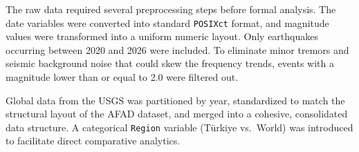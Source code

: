 \documentclass[
  11pt,
  a4paper,
  DIV=11,
  numbers=noendperiod]{scrartcl}
\newenvironment{Shaded}{\begin{snugshade}}{\end{snugshade}}
\newcommand{\AttributeTok}[1]{\textcolor[rgb]{0.40,0.45,0.13}{#1}}
\newcommand{\CommentTok}[1]{\textcolor[rgb]{0.37,0.37,0.37}{#1}}
\newcommand{\DecValTok}[1]{\textcolor[rgb]{0.68,0.00,0.00}{#1}}
\newcommand{\FunctionTok}[1]{\textcolor[rgb]{0.28,0.35,0.67}{#1}}
\newcommand{\NormalTok}[1]{\textcolor[rgb]{0.00,0.23,0.31}{#1}}
\newcommand{\OtherTok}[1]{\textcolor[rgb]{0.00,0.23,0.31}{#1}}
\newcommand{\SpecialCharTok}[1]{\textcolor[rgb]{0.37,0.37,0.37}{#1}}
\newcommand{\StringTok}[1]{\textcolor[rgb]{0.13,0.47,0.30}{#1}}
\begin{document}
The raw data required several preprocessing steps before formal
analysis. The date variables were converted into standard
\texttt{POSIXct} format, and magnitude values were transformed into a
uniform numeric layout. Only earthquakes occurring between 2020 and 2026
were included. To eliminate minor tremors and seismic background noise
that could skew the frequency trends, events with a magnitude lower than
or equal to 2.0 were filtered out.

Global data from the USGS was partitioned by year, standardized to match
the structural layout of the AFAD dataset, and merged into a cohesive,
consolidated data structure. A categorical \texttt{Region} variable
(Türkiye vs.~World) was introduced to facilitate direct comparative
analytics.

\begin{Shaded}
\end{Shaded}
\end{document}

